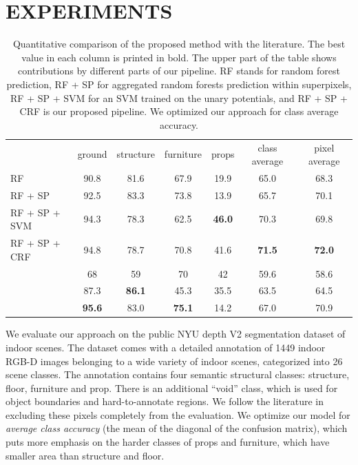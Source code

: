 \documentclass[a4paper, 10pt, conference]{ieeeconf}      %
\begin{document}
\section{EXPERIMENTS}

\begin{table}[t]
\centering
\begin{tabularx}{\linewidth}{@{\extracolsep{\fill}}lcccccc}
\toprule
                        & ground        &  structure    & furniture     & props         & class average   & pixel average\\
\cmidrule(r){1-7}

RF                      &         90.8  &   81.6        & 67.9          & 19.9          &  65.0        &  68.3 \\
RF + SP                 &         92.5  &   83.3        & 73.8          & 13.9          &  65.7        &  70.1 \\ 
RF + SP + SVM           &         94.3  &   78.3        & 62.5          & \textbf{46.0} &  70.3        &  69.8 \\
RF + SP + CRF           &         94.8  &   78.7        &          70.8 & 41.6          &\textbf{71.5} &  \textbf{72.0} \\
\cmidrule(r){1-7}
\citet{SilbermanECCV12} &         68    &   59          & 70           & 42            &  59.6        & 58.6 \\
\citet{couprie-iclr-13} &         87.3  & \textbf{86.1} & 45.3         & 35.5          &  63.5        & 64.5 \\
\citet{stueckler2013}   & \textbf{95.6} &   83.0        & \textbf{75.1}& 14.2          &  67.0        & 70.9 \\

\bottomrule
\end{tabularx}
    \caption{Quantitative comparison of the proposed method with the
literature. The best value in each column is printed in bold. The upper part of
the table shows contributions by different parts of our pipeline. RF stands for random forest prediction, RF + SP for aggregated
random forests prediction within superpixels, RF + SP + SVM for an SVM trained on the unary potentials, and RF + SP + CRF is
our proposed pipeline. We optimized our approach for class average
accuracy.}
\end{table}

We evaluate our approach on the public NYU depth V2 segmentation dataset of
indoor scenes.  The dataset comes with a detailed annotation of 1449 indoor
RGB-D images belonging to a wide variety of indoor scenes, categorized into 26
scene classes.  The annotation contains four semantic structural classes:
structure, floor, furniture and prop. There is an additional ``void'' class,
which is used for object boundaries and hard-to-annotate regions. We follow the
literature in excluding these pixels completely from the evaluation.
We optimize our model for \emph{average class accuracy} (the mean of the
diagonal of the confusion matrix), which puts more emphasis on the harder
classes of props and furniture, which have smaller area than structure and
floor.
\end{document}
